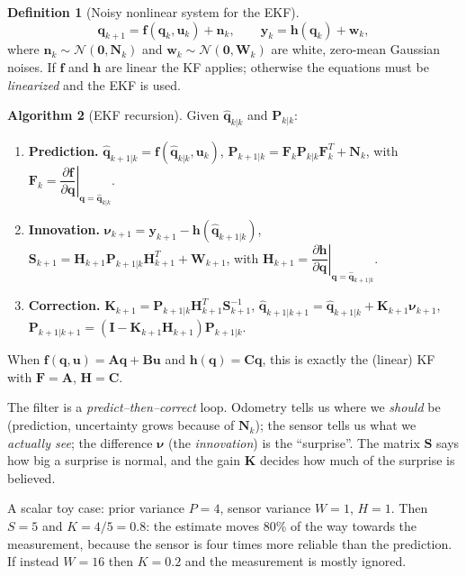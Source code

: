 \documentclass[11pt,a4paper]{article}
\theoremstyle{definition}
\newtheorem{definition}{Definition}[section]
\newtheorem{algorithm}[definition]{Algorithm}
\theoremstyle{plain}
\theoremstyle{remark}
\newcommand{\hq}{\hat{\bm q}}
\begin{document}
\begin{definition}[Noisy nonlinear system for the EKF]
\label{def:system}
\[
\bm q_{k+1}=\bm f(\bm q_k,\bm u_k)+\bm n_k,\qquad 
\bm y_k=\bm h(\bm q_k)+\bm w_k ,
\]
where $\bm n_k\sim\mathcal N(\bm 0,\bm N_k)$ and $\bm w_k\sim\mathcal N(\bm 0,\bm W_k)$ are white, zero-mean Gaussian noises. If $\bm f$ and $\bm h$ are linear the KF applies; otherwise the equations must be \emph{linearized} and the EKF is used.
\end{definition}

\begin{algorithm}[EKF recursion]
\label{alg:ekf}
Given $\hq_{k|k}$ and $\bm P_{k|k}$:
\begin{enumerate}[label=\textbf{\arabic*.},leftmargin=1.6em]
  \item \textbf{Prediction.} $\hq_{k+1|k}=\bm f(\hq_{k|k},\bm u_k)$, \quad $\bm P_{k+1|k}=\bm F_k\bm P_{k|k}\bm F_k^T+\bm N_k$, \quad with $\bm F_k=\left.\dfrac{\partial\bm f}{\partial\bm q}\right|_{\bm q=\hq_{k|k}}$.
  \item \textbf{Innovation.} $\bm\nu_{k+1}=\bm y_{k+1}-\bm h(\hq_{k+1|k})$, \quad $\bm S_{k+1}=\bm H_{k+1}\bm P_{k+1|k}\bm H_{k+1}^T+\bm W_{k+1}$, \quad with $\bm H_{k+1}=\left.\dfrac{\partial\bm h}{\partial\bm q}\right|_{\bm q=\hq_{k+1|k}}$.
  \item \textbf{Correction.} $\bm K_{k+1}=\bm P_{k+1|k}\bm H_{k+1}^T\bm S_{k+1}^{-1}$, \quad $\hq_{k+1|k+1}=\hq_{k+1|k}+\bm K_{k+1}\bm\nu_{k+1}$, \quad $\bm P_{k+1|k+1}=(\bm I-\bm K_{k+1}\bm H_{k+1})\bm P_{k+1|k}$.
\end{enumerate}
When $\bm f(\bm q,\bm u)=\bm A\bm q+\bm B\bm u$ and $\bm h(\bm q)=\bm C\bm q$, this is exactly the (linear) KF with $\bm F=\bm A$, $\bm H=\bm C$.
\end{algorithm}

\begin{intuition}
The filter is a \emph{predict--then--correct} loop. Odometry tells us where we \emph{should} be (prediction, uncertainty grows because of $\bm N_k$); the sensor tells us what we \emph{actually see}; the difference $\bm\nu$ (the \emph{innovation}) is the ``surprise''. The matrix $\bm S$ says how big a surprise is normal, and the gain $\bm K$ decides how much of the surprise is believed.

A scalar toy case: prior variance $P=4$, sensor variance $W=1$, $H=1$. Then $S=5$ and $K=4/5=0.8$: the estimate moves 80\% of the way towards the measurement, because the sensor is four times more reliable than the prediction. If instead $W=16$ then $K=0.2$ and the measurement is mostly ignored.
\end{intuition}
\end{document}
